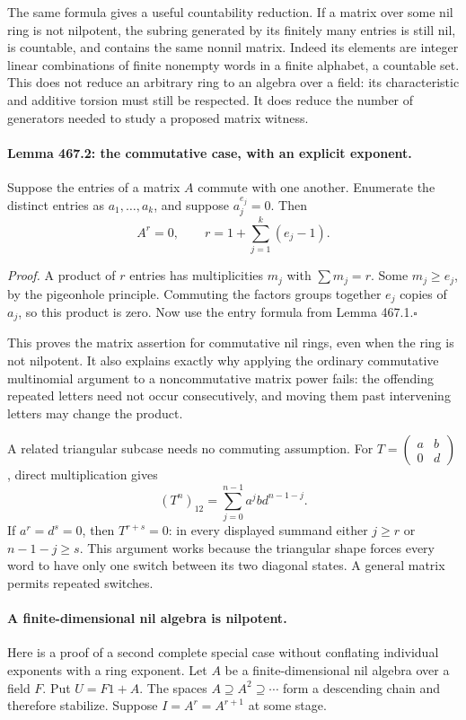 \documentclass[11pt]{article}
\begin{document}
The same formula gives a useful countability reduction. If a matrix over
some nil ring is not nilpotent, the subring generated by its finitely many
entries is still nil, is countable, and contains the same nonnil matrix.
Indeed its elements are integer linear combinations of finite nonempty
words in a finite alphabet, a countable set. This does not reduce an
arbitrary ring to an algebra over a field: its characteristic and additive
torsion must still be respected. It does reduce the number of generators
needed to study a proposed matrix witness.

\paragraph{Lemma 467.2: the commutative case, with an explicit exponent.}
Suppose the entries of a matrix $A$ commute with one another. Enumerate
the distinct entries as $a_1,\ldots,a_k$, and suppose $a_j^{e_j}=0$.
Then
\begin{equation}\label{a467:pigeon}
 A^r=0,\qquad r=1+\sum_{j=1}^k(e_j-1).
\end{equation}

\emph{Proof.} A product of $r$ entries has multiplicities $m_j$ with
$\sum m_j=r$. Some $m_j\ge e_j$, by the pigeonhole principle. Commuting
the factors groups together $e_j$ copies of $a_j$, so this product is
zero. Now use the entry formula from Lemma 467.1.\hfill$\square$

This proves the matrix assertion for commutative nil rings, even when the
ring is not nilpotent. It also explains exactly why applying the ordinary
commutative multinomial argument to a noncommutative matrix power fails:
the offending repeated letters need not occur consecutively, and moving
them past intervening letters may change the product.

A related triangular subcase needs no commuting assumption. For
$T=\left(\begin{smallmatrix}a&b\\0&d\end{smallmatrix}\right)$,
direct multiplication gives
\[
 (T^n)_{12}=\sum_{j=0}^{n-1}a^jbd^{n-1-j}.
\]
If $a^r=d^s=0$, then $T^{r+s}=0$: in every displayed summand either
$j\ge r$ or $n-1-j\ge s$. This argument works because the triangular
shape forces every word to have only one switch between its two diagonal
states. A general matrix permits repeated switches.

\paragraph{A finite-dimensional nil algebra is nilpotent.}
Here is a proof of a second complete special case without conflating
individual exponents with a ring exponent. Let $A$ be a finite-dimensional
nil algebra over a field $F$. Put $U=F1+A$. The spaces
$A\supseteq A^2\supseteq\cdots$ form a descending chain and therefore
stabilize. Suppose $I=A^r=A^{r+1}$ at some stage.
\end{document}
